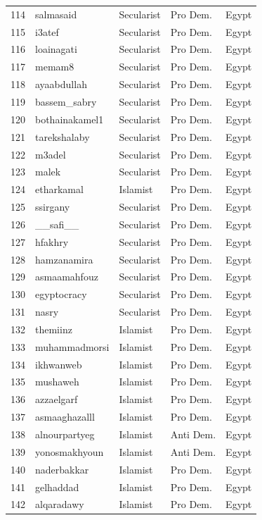 \documentclass[12pt]{article}
\begin{document}
\begin{longtable}{rllll}
	114 & salmasaid & Secularist & Pro Dem. & Egypt \\ 
	115 & i3atef & Secularist & Pro Dem. & Egypt \\ 
	116 & loainagati & Secularist & Pro Dem. & Egypt \\ 
	117 & memam8 & Secularist & Pro Dem. & Egypt \\ 
	118 & ayaabdullah & Secularist & Pro Dem. & Egypt \\ 
	119 & bassem\_sabry & Secularist & Pro Dem. & Egypt \\ 
	120 & bothainakamel1 & Secularist & Pro Dem. & Egypt \\ 
	121 & tarekshalaby & Secularist & Pro Dem. & Egypt \\ 
	122 & m3adel & Secularist & Pro Dem. & Egypt \\ 
	123 & malek & Secularist & Pro Dem. & Egypt \\ 
	124 & etharkamal & Islamist & Pro Dem. & Egypt \\ 
	125 & ssirgany & Secularist & Pro Dem. & Egypt \\ 
	126 & \_\_safi\_\_ & Secularist & Pro Dem. & Egypt \\ 
	127 & hfakhry & Secularist & Pro Dem. & Egypt \\ 
	128 & hamzanamira & Secularist & Pro Dem. & Egypt \\ 
	129 & asmaamahfouz & Secularist & Pro Dem. & Egypt \\ 
	130 & egyptocracy & Secularist & Pro Dem. & Egypt \\ 
	131 & nasry & Secularist & Pro Dem. & Egypt \\ 
	132 & themiinz & Islamist & Pro Dem. & Egypt \\ 
	133 & muhammadmorsi & Islamist & Pro Dem. & Egypt \\ 
	134 & ikhwanweb & Islamist & Pro Dem. & Egypt \\ 
	135 & mushaweh & Islamist & Pro Dem. & Egypt \\ 
	136 & azzaelgarf & Islamist & Pro Dem. & Egypt \\ 
	137 & asmaaghazalll & Islamist & Pro Dem. & Egypt \\ 
	138 & alnourpartyeg & Islamist & Anti Dem. & Egypt \\ 
	139 & yonosmakhyoun & Islamist & Anti Dem. & Egypt \\ 
	140 & naderbakkar & Islamist & Pro Dem. & Egypt \\ 
	141 & gelhaddad & Islamist & Pro Dem. & Egypt \\ 
	142 & alqaradawy & Islamist & Pro Dem. & Egypt \\ 
	\hline
	\hline
\end{longtable}
\end{document}

